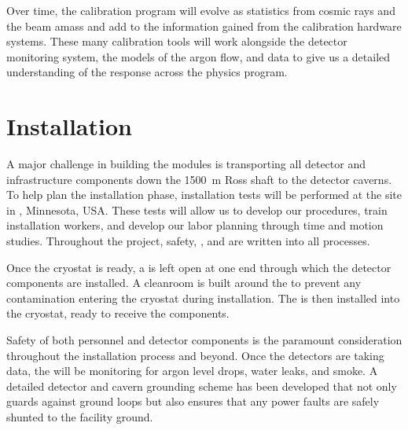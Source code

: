 Over time, the  calibration program will evolve as statistics from cosmic rays and the  beam amass and add to the information gained from the calibration hardware systems. These many calibration tools will work alongside the detector monitoring system, the  models of the argon flow, and  data to give us a detailed understanding of the  response across the  physics program.


\section{Installation}

A major challenge in building the   modules is transporting all detector and infrastructure components down the \SI{1500}{\meter} Ross shaft to the detector caverns. To help plan the installation phase, installation tests will be performed at the   site in , Minnesota, USA. These tests will allow us to develop our procedures, train installation workers, and develop our labor planning through time and motion studies. Throughout the project, safety, , and  are written into all processes.

Once the  cryostat is ready, %
a  is left open at one end through which the detector components are installed. A cleanroom is built around the  to prevent any contamination entering the cryostat during installation. The  is then installed into the cryostat, ready to receive the  components. 


Safety of both personnel and  detector components is the paramount consideration throughout the installation process and beyond. Once the detectors are taking data, %
the  will be monitoring for argon level drops, water leaks, and smoke. A detailed detector and cavern grounding scheme has been developed that not only guards against ground loops but also ensures that any power faults are safely shunted to the facility ground.

